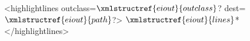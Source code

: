 <highlightlines outclass=$\xmlstructref{eiout}{outclass}$? dest=$\xmlstructref{eiout}{path}$?>
  $\xmlstructref{eiout}{lines}$*
</highlightlines>
